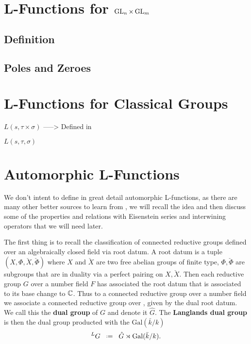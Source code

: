 
\section{L-Functions for \(\operatorname{GL}_n\times \operatorname{GL}_m\)}
\subsection{Definition}
\cite{cogdellLECTURESINTEGRALREPRESENTATIONS}

\subsection{Poles and Zeroes}


\section{L-Functions for Classical Groups}

\(L(s, \tau\times \sigma)\)
\cite{remarks on rankin selberg convolutions Cogdel and PT-shapiro}\cite{cogdellFunctorialityClassicalGroups2004} -----> Defined in \cite{shahidiProofLanglandsConjecture1990}

\(L(s, \tau, \sigma)\)
\cite{grbacResidualSpectrumSplit2011}

\section{Automorphic L-Functions}
We don't intent to define in great detail automorphic L-functions, as there are many other better sources to learn from \cite[Part 2.III.2]{borelAutomorphicFormsRepresentations1979}\cite{shahidiEisensteinSeriesAutomorphic2010}\cite{cogdellLFUNCTIONSFUNCTORIALITY}\cite[9, 10, 11]{bumpIntroductionLanglandsProgram2004}\cite{arthurLfunctionsAutomorphicRepresenta}, we will recall the idea and then discuss some of the properties and relations with Eisenstein series and interwining operators that we will need later.

The first thing is to recall the classification of connected reductive groups defined over an algebraically closed field via root datum. A root datum is a tuple \((X, \Phi, \check{X} , \check{\Phi})\) where \(X\) and \(\check{X}\) are two free abelian groups of finite type, \(\Phi, \check{\Phi}\) are subgroups that are in duality via a perfect pairing on \(X, \check{X}\). Then each reductive group \(G\) over a number field \(F\) has associated the root datum that is associated to its base change to \(\C\). Thus to a connected reductive group over a number field we associate a connected reductive group over \C, given by the dual root datum. We call this the \textbf{dual group} of \(G\) and denote it \(\hat{G}\). The \textbf{Langlands dual group} is then the dual group producted with the \(\mathrm{Gal}(\bar{k}/k)\)
\[^L G \defeq \hat{G} \rtimes \mathrm{Gal}(\bar{k}/k).\]

